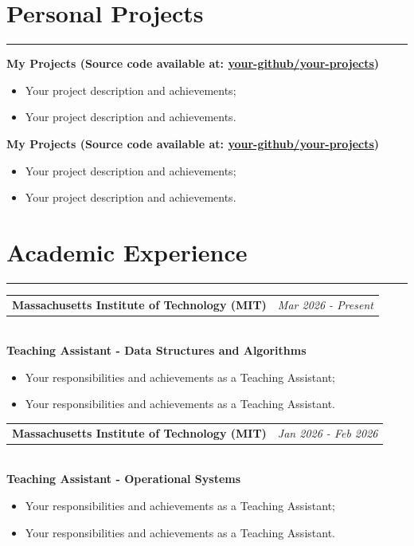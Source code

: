\documentclass[10pt]{article}
\makeatletter
\newcommand{\sectionline}{\vspace{-2pt}\noindent\rule{\linewidth}{0.6pt}\vspace{1pt}}
\newcommand{\itemheader}[2]{%
  \noindent
  \begin{tabular*}{\linewidth}{@{\extracolsep{\fill}} l r}
    \textbf{#1} & \textit{#2}
  \end{tabular*}\\[2pt]
}
\makeatother
\begin{document}
\vspace{1pt}


\section*{Personal Projects}
\sectionline

\textbf{My Projects (Source code available at: \href{https://github.com/your-github/your-projects}{your-github/your-projects})}
\begin{itemize}
    \item Your project description and achievements;
    \item Your project description and achievements.
\end{itemize}

\vspace{1pt}

\textbf{My Projects (Source code available at: \href{https://github.com/your-github/your-projects}{your-github/your-projects})}
\begin{itemize}
    \item Your project description and achievements;
    \item Your project description and achievements.
\end{itemize}

\vspace{1pt}

\section*{Academic Experience}
\sectionline

\itemheader{Massachusetts Institute of Technology (MIT)}{Mar 2026 - Present}
\textbf{Teaching Assistant - Data Structures and Algorithms}
\begin{itemize}
    \item Your responsibilities and achievements as a Teaching Assistant;
    \item Your responsibilities and achievements as a Teaching Assistant.
\end{itemize}

\vspace{1pt}

\itemheader{Massachusetts Institute of Technology (MIT)}{Jan 2026 - Feb 2026}
\textbf{Teaching Assistant - Operational Systems}
\begin{itemize}
    \item Your responsibilities and achievements as a Teaching Assistant;
    \item Your responsibilities and achievements as a Teaching Assistant.
\end{itemize}
\end{document}
